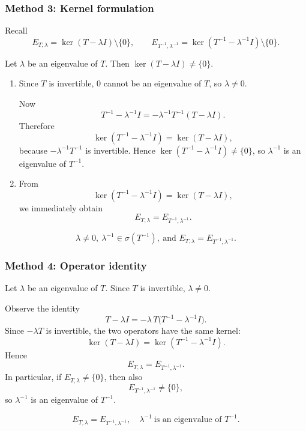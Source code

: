 \documentclass[12pt]{article}
\begin{document}
\newpage
\subsubsection{Method 3: Kernel formulation}

Recall
\[
E_{T,\lambda}=\ker(T-\lambda I)\setminus\{0\},
\qquad
E_{T^{-1},\lambda^{-1}}=\ker(T^{-1}-\lambda^{-1}I)\setminus\{0\}.
\]

Let $\lambda$ be an eigenvalue of $T$. Then $\ker(T-\lambda I)\neq\{0\}$.

\begin{enumerate}[label=(\arabic*)]
\item Since $T$ is invertible, $0$ cannot be an eigenvalue of $T$, so $\lambda\neq 0$.

Now
\[
T^{-1}-\lambda^{-1}I
=
-\lambda^{-1}T^{-1}(T-\lambda I).
\]
Therefore
\[
\ker(T^{-1}-\lambda^{-1}I)=\ker(T-\lambda I),
\]
because $-\lambda^{-1}T^{-1}$ is invertible. Hence $\ker(T^{-1}-\lambda^{-1}I)\neq\{0\}$, so $\lambda^{-1}$ is an eigenvalue of $T^{-1}$.

\item From
\[
\ker(T^{-1}-\lambda^{-1}I)=\ker(T-\lambda I),
\]
we immediately obtain
\[
E_{T,\lambda}=E_{T^{-1},\lambda^{-1}}.
\]
\end{enumerate}

\[
\boxed{\,\lambda\neq 0,\ \lambda^{-1}\in \sigma(T^{-1}),\ \text{and }E_{T,\lambda}=E_{T^{-1},\lambda^{-1}}.\,}
\]

\bigskip
\subsubsection{Method 4: Operator identity}

Let $\lambda$ be an eigenvalue of $T$. Since $T$ is invertible, $\lambda\neq 0$.

Observe the identity
\[
T-\lambda I
=
-\lambda\,T\bigl(T^{-1}-\lambda^{-1}I\bigr).
\]
Since $-\lambda T$ is invertible, the two operators have the same kernel:
\[
\ker(T-\lambda I)=\ker(T^{-1}-\lambda^{-1}I).
\]
Hence
\[
E_{T,\lambda}=E_{T^{-1},\lambda^{-1}}.
\]
In particular, if $E_{T,\lambda}\neq \{0\}$, then also
\[
E_{T^{-1},\lambda^{-1}}\neq \{0\},
\]
so $\lambda^{-1}$ is an eigenvalue of $T^{-1}$.

\[
\boxed{\,E_{T,\lambda}=E_{T^{-1},\lambda^{-1}},\quad \lambda^{-1}\ \text{is an eigenvalue of }T^{-1}.\,}
\]
\end{document}
